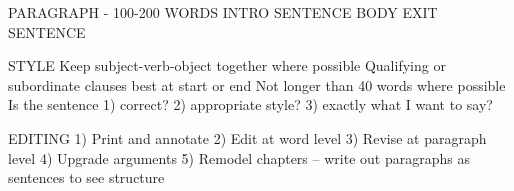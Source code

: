 PARAGRAPH - 100-200 WORDS
INTRO SENTENCE
BODY
EXIT SENTENCE

STYLE
Keep subject-verb-object together where possible
Qualifying or subordinate clauses best at start or end
Not longer than 40 words where possible
Is the sentence 1) correct? 2) appropriate style? 3) exactly what I want to say?

EDITING
1) Print and annotate
2) Edit at word level
3) Revise at paragraph level
4) Upgrade arguments
5) Remodel chapters -- write out paragraphs as sentences to see structure































